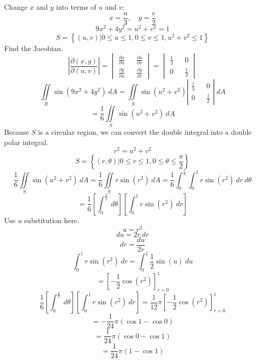 \documentclass[12pt, letterpaper]{article}
\newcommand{\pderiv}[2]{\frac{\partial #1}{\partial #2}}
\begin{document}
\begin{enumerate}
      Change $x$ and $y$ into terms of $u$ and $v$:
      \[x = \frac{u}{3}, \quad y = \frac{v}{2}\]
      \[9x^2 + 4y^2  = u^2 + v^2 = 1\]
      \[S = \left\{(u, v) | 0 \le u \le 1, 0 \le v \le 1, u^2 + v^2 \le 1\right\}\]
      Find the Jacobian.
      \[\left|\frac{\partial(x, y)}{\partial(u, v)}\right|
      = \begin{vmatrix}
        \pderiv{x}{u} && \pderiv{x}{v} \\
        \pderiv{y}{u} && \pderiv{y}{v}
      \end{vmatrix}
      = \begin{vmatrix}
        \frac{1}{3} && 0 \\
        0 && \frac{1}{2}
      \end{vmatrix}\]
      \[\iint\limits_R \sin(9x^2 + 4y^2)\ dA
      = \iint\limits_S \sin(u^2 + v^2) \left|\begin{matrix}
        \frac{1}{3} && 0 \\
        0 && \frac{1}{2}
      \end{matrix}\right|\ dA\]
      \[= \frac{1}{6}\iint\limits_S \sin(u^2 + v^2)\ dA\]
      Because $S$ is a circular region,
      we can convert the double integral into a double polar integral.
      \[r^2 = u^2 + v^2\]
      \[S = \left\{(r, \theta) | 0 \le r \le 1, 0 \le \theta \le \frac{\pi}{2}\right\}\]
      \[\frac{1}{6}\iint\limits_S \sin(u^2 + v^2)\ dA
      = \frac{1}{6}\iint\limits_S r \sin(r^2)\ dA
      = \frac{1}{6}\int_{0}^{\frac{\pi}{2}} \int_{0}^{1} r \sin(r^2)\ dr\ d\theta\]
      \[ = \frac{1}{6}
      \left[\int_{0}^{\frac{\pi}{2}}\ d\theta\right]
      \left[\int_{0}^{1} r \sin(r^2)\ dr\right]\]
      Use $u$ substitution here.
      \[u = r^2\]
      \[du = 2r\ dr\]
      \[dr = \frac{du}{2r}\]
      \[\int_0^1 r \sin(r^2)\ dr = \int_{0}^{1} \frac{1}{2} \sin(u)\ du\]
      \[ = \left[- \frac{1}{2} \cos(r^2)\right]_{r = 0}^1\]
      \[\frac{1}{6}
      \left[\int_{0}^{\frac{\pi}{2}}\ d\theta\right]
      \left[\int_{0}^{1} r \sin(r^2)\ dr\right]
      = \frac{1}{12}\pi \left[- \frac{1}{2} \cos(r^2)\right]_{r = 0}^1\]
      \[ = - \frac{1}{24}\pi\left(\cos 1 - \cos 0\right)\]
      \[ =  \frac{1}{24}\pi\left(\cos 0 - \cos 1\right)\]
      \[ =  \frac{1}{24}\pi\left(1 - \cos 1\right)\]
\end{enumerate}
\end{document}
